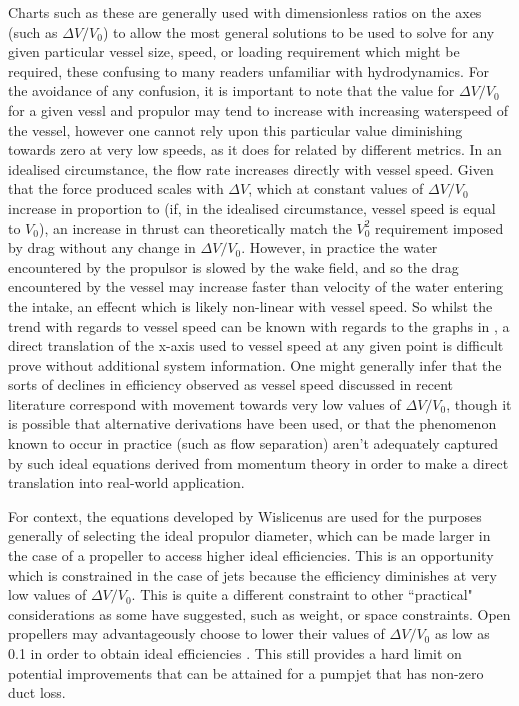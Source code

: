 \documentclass{article}\usepackage[]{graphicx}\usepackage[]{color}
\begin{document}
Charts such as these are generally used with dimensionless ratios on the axes (such as $\Delta V / V_0$) to allow the most general solutions to be used to solve for any given particular vessel size, speed, or loading requirement which might be required, these  confusing to many readers unfamiliar with hydrodynamics.  For the avoidance of any confusion, it is important to note that the value for $\Delta V / V_0$ for a given vessl and propulor may tend to increase with increasing waterspeed of the vessel, however one cannot rely upon this particular value diminishing towards zero at very low speeds, as it does for related by different metrics.  In an idealised circumstance, the flow rate increases directly with vessel speed.  Given that the force produced scales with $\Delta V$, which at constant values of $\Delta V / V_0$ increase in proportion to (if, in the idealised circumstance, vessel speed is equal to $V_0$), an increase in thrust can theoretically match the $V_0^2$ requirement imposed by drag without any change in $\Delta V / V_0$.  However, in practice the water encountered by the propulsor is slowed by the wake field, and so the drag encountered by the vessel may increase faster than velocity of the water entering the intake, an effecnt which is likely non-linear with vessel speed.  So whilst the trend with regards to vessel speed can be known with regards to the graphs in \cite{fig:PumpjetEfficiency.png}, a direct translation of the x-axis used to vessel speed at any given point is difficult prove without additional system information.  One might generally infer that the sorts of declines in efficiency observed as vessel speed discussed in recent literature correspond with movement towards very low values of $\Delta V / V_0$, though it is possible that alternative derivations have been used, or that the phenomenon known to occur in practice (such as flow separation) aren't adequately captured by such ideal equations derived from momentum theory in order to make a direct translation into real-world application.

For context, the equations developed by Wislicenus are used for the purposes generally of selecting the ideal propulor diameter, which can be made larger in the case of a propeller to access higher ideal efficiencies.  This is an opportunity which is constrained in the case of jets because the efficiency diminishes at very low values of $\Delta V / V_0$.  This is quite a different constraint to other ``practical" considerations as some have suggested, such as weight, or space constraints.  Open propellers may advantageously choose to lower their values of $\Delta V / V_0$ as low as 0.1 in order to obtain ideal efficiencies \parencite{wislicenus1973}.  This still provides a hard limit on potential improvements that can be attained for a pumpjet that has non-zero duct loss.
\end{document}
